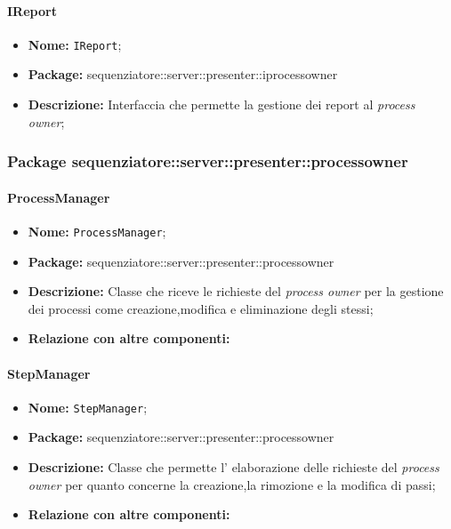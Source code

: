 \paragraph{IReport}
	\begin{itemize}
		\item \textbf{Nome:} \texttt{IReport};
		\item \textbf{Package:} sequenziatore::server::presenter::iprocessowner
		\item \textbf{Descrizione:} Interfaccia che permette la gestione dei report al \textit{process owner};
	\end{itemize}

\subsubsection{Package sequenziatore::server::presenter::processowner}

\paragraph{ProcessManager}
	\begin{itemize}
		\item \textbf{Nome:} \texttt{ProcessManager};
		\item \textbf{Package:} sequenziatore::server::presenter::processowner
		\item \textbf{Descrizione:} Classe che riceve le richieste del \textit{process owner} per la gestione dei processi come creazione,modifica e eliminazione degli stessi;
		\item \textbf{Relazione con altre componenti:}
	\end{itemize}
\paragraph{StepManager}
	\begin{itemize}
		\item \textbf{Nome:} \texttt{StepManager};
		\item \textbf{Package:} sequenziatore::server::presenter::processowner
		\item \textbf{Descrizione:} Classe che permette l' elaborazione delle richieste del \textit{process owner} per quanto concerne la creazione,la rimozione e la modifica di passi;
		\item \textbf{Relazione con altre componenti:}
	\end{itemize}
